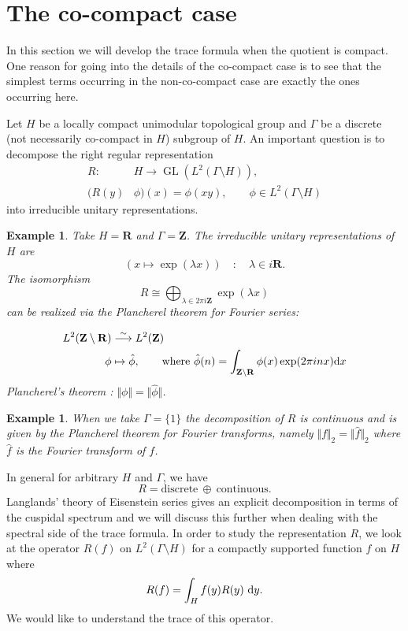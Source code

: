 \documentclass[11pt]{amsart}
\def\R{\mathbf R}
\def\Z{\mathbf Z}
\def\d{\text d}
\def\bs{\setminus} 			%
\def\gl{\operatorname{GL}}
\def\Ltwo{L^2}
\def\norm#1{\Vert #1 \Vert} %
\newtheorem{example}[theorem]{Example}
\theoremstyle{remark}
\begin{document}
\section{The co-compact case} \label{sec_cpt}

In this section we will develop the trace formula when the quotient is compact. One reason for going into the details of the co-compact case is to see that the simplest terms occurring in the non-co-compact case are exactly the ones occurring here. 

Let $H$ be a locally compact unimodular topological group and $\Gamma$ be a discrete (not necessarily co-compact in $H$) subgroup of $H$. An important question is to decompose the right regular representation 
\begin{align*}
	R : & H \to \gl(\Ltwo(\Gamma \bs H)), \\
	(R(y) & \phi)(x) = \phi(xy), \qquad \phi \in \Ltwo(\Gamma\bs H)
\end{align*}
into irreducible unitary representations. 
\begin{example}
	Take $H = \R$ and $\Gamma = \Z$. The irreducible unitary representations of $H$ are 
	\[ (x \mapsto \exp(\lambda x)) \quad : \quad \lambda \in i\R. \]
	The isomorphism 
	\[ R \cong \displaystyle\bigoplus_{\lambda \in 2\pi i \Z} \exp(\lambda x) \]
	can be realized via the Plancherel theorem for Fourier series:
	
	\begin{align*}
		\Ltwo(\Z \bs \R) & \overset{\sim}{\longrightarrow} \Ltwo(\Z) \\
		\phi & \mapsto \hat\phi, \qquad \text{where }\hat\phi(n) = \int_{\Z\bs \R} \phi(x) \exp(2\pi i n x) \d x
	\end{align*}
	Plancherel's theorem : $\norm{\phi} = \norm{\hat\phi}$. 
\end{example}

\begin{example}
	When we take $\Gamma = \{1\}$ the decomposition of $R$ is continuous and is given by the Plancherel theorem for Fourier transforms, namely $\norm{f}_2 = \norm{\hat f}_2$ where $\hat f$ is the Fourier transform of $f$. 
\end{example}

In general for arbitrary $H$ and $\Gamma$, we have 
\[ R = \text{discrete} \ \oplus \ \text{continuous}. \]
Langlands' theory of Eisenstein series gives an explicit decomposition in terms of the cuspidal spectrum and we will discuss this further when dealing with the spectral side of the trace formula. In order to study the representation $R$, we look at the operator $R(f)$ on $\Ltwo(\Gamma\bs H)$ for a compactly supported function $f$ on $H$ where
\[ R(f) = \int_H f(y) R(y)\ \d y. \]
We would like to understand the trace of this operator. 
\end{document}
